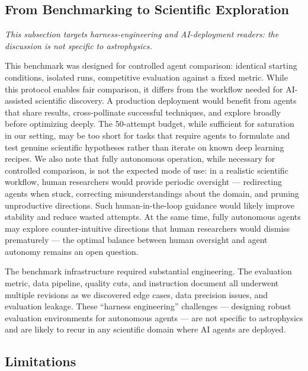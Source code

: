\documentclass[universe,article,submit,pdftex,oneauthor]{Definitions/mdpi}
\begin{document}
\subsection{From Benchmarking to Scientific Exploration}

\emph{This subsection targets harness-engineering and AI-deployment readers: the discussion is not specific to astrophysics.}

This benchmark was designed for controlled agent comparison: identical starting conditions, isolated runs, competitive evaluation against a fixed metric. While this protocol enables fair comparison, it differs from the workflow needed for AI-assisted scientific discovery. A production deployment would benefit from agents that share results, cross-pollinate successful techniques, and explore broadly before optimizing deeply. The 50-attempt budget, while sufficient for saturation in our setting, may be too short for tasks that require agents to formulate and test genuine scientific hypotheses rather than iterate on known deep learning recipes. We also note that fully autonomous operation, while necessary for controlled comparison, is not the expected mode of use: in a realistic scientific workflow, human researchers would provide periodic oversight --- redirecting agents when stuck, correcting misunderstandings about the domain, and pruning unproductive directions. Such human-in-the-loop guidance would likely improve stability and reduce wasted attempts. At the same time, fully autonomous agents may explore counter-intuitive directions that human researchers would dismiss prematurely --- the optimal balance between human oversight and agent autonomy remains an open question.

The benchmark infrastructure required substantial engineering. The evaluation metric, data pipeline, quality cuts, and instruction document all underwent multiple revisions as we discovered edge cases, data precision issues, and evaluation leakage. These ``harness engineering'' challenges --- designing robust evaluation environments for autonomous agents --- are not specific to astrophysics and are likely to recur in any scientific domain where AI agents are deployed.

\subsection{Limitations}
\label{sec:limitations}
\end{document}
